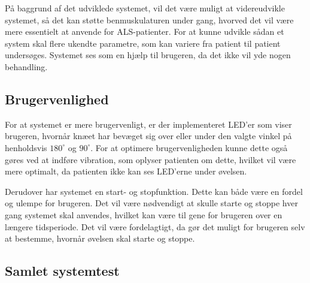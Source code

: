 På baggrund af det udviklede systemet, vil det være muligt at videreudvikle systemet, så det kan støtte benmuskulaturen under gang, hvorved det vil være mere essentielt at anvende for ALS-patienter. For at kunne udvikle sådan et system skal flere ukendte parametre, som kan variere fra patient til patient undersøges. Systemet ses som en hjælp til brugeren, da det ikke vil yde nogen behandling. 

\subsection{Brugervenlighed}
For at systemet er mere brugervenligt, er der implementeret LED'er som viser brugeren, hvornår knæet har bevæget sig over eller under den valgte vinkel på henholdsvis $180^{\circ}$ og $90^{\circ}$. For at optimere brugervenligheden kunne dette også gøres ved at indføre vibration, som oplyser patienten om dette, hvilket vil være mere optimalt, da patienten ikke kan ses LED'erne under øvelsen.

Derudover har systemet en start- og stopfunktion. Dette kan både være en fordel og ulempe for brugeren. Det vil være nødvendigt at skulle starte og stoppe hver gang systemet skal anvendes, hvilket kan være til gene for brugeren over en længere tidsperiode. Det vil være fordelagtigt, da gør det muligt for brugeren selv at bestemme, hvornår øvelsen skal starte og stoppe.

\subsection{Samlet systemtest}